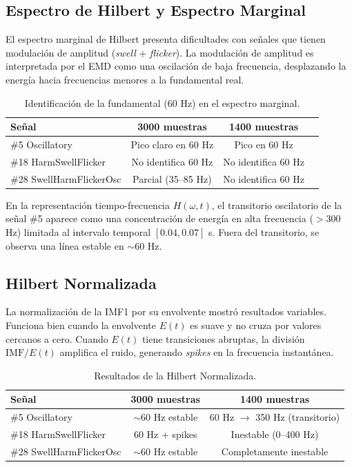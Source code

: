 \documentclass[12pt,a4paper]{article}
\begin{document}
\subsection{Espectro de Hilbert y Espectro Marginal}

El espectro marginal de Hilbert presenta dificultades con señales que tienen modulación de amplitud (\textit{swell} + \textit{flicker}). La modulación de amplitud es interpretada por el EMD como una oscilación de baja frecuencia, desplazando la energía hacia frecuencias menores a la fundamental real.

\begin{table}[H]
\centering
\caption{Identificación de la fundamental (60 Hz) en el espectro marginal.}
\begin{tabular}{@{}lccc@{}}
\toprule
\textbf{Señal} & \textbf{3000 muestras} & \textbf{1400 muestras} \\
\midrule
\#5 Oscillatory & Pico claro en 60 Hz & Pico en 60 Hz \\
\#18 HarmSwellFlicker & No identifica 60 Hz & No identifica 60 Hz \\
\#28 SwellHarmFlickerOsc & Parcial (35--85 Hz) & No identifica 60 Hz \\
\bottomrule
\end{tabular}
\label{tab:espectro_marginal}
\end{table}

En la representación tiempo-frecuencia $H(\omega,t)$, el transitorio oscilatorio de la señal \#5 aparece como una concentración de energía en alta frecuencia ($>300$ Hz) limitada al intervalo temporal $[0.04, 0.07]$ s. Fuera del transitorio, se observa una línea estable en $\sim60$ Hz.


\subsection{Hilbert Normalizada}

La normalización de la IMF1 por su envolvente mostró resultados variables. Funciona bien cuando la envolvente $E(t)$ es suave y no cruza por valores cercanos a cero. Cuando $E(t)$ tiene transiciones abruptas, la división $\text{IMF}/E(t)$ amplifica el ruido, generando \textit{spikes} en la frecuencia instantánea.

\begin{table}[H]
\centering
\caption{Resultados de la Hilbert Normalizada.}
\begin{tabular}{@{}lcc@{}}
\toprule
\textbf{Señal} & \textbf{3000 muestras} & \textbf{1400 muestras} \\
\midrule
\#5 Oscillatory & $\sim$60 Hz estable & 60 Hz $\rightarrow$ 350 Hz (transitorio) \\
\#18 HarmSwellFlicker & 60 Hz + spikes & Inestable (0--400 Hz) \\
\#28 SwellHarmFlickerOsc & $\sim$60 Hz estable & Completamente inestable \\
\bottomrule
\end{tabular}
\label{tab:hilbert_norm}
\end{table}
\end{document}
